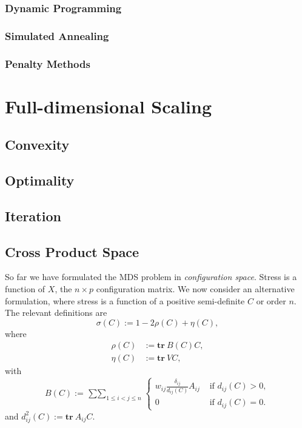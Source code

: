 \documentclass[
  12pt,
  letterpaper,
  DIV=11,
  numbers=noendperiod]{scrreprt}
\theoremstyle{remark}
\begin{document}
\subsection{Dynamic Programming}\label{unidynamic}

\subsection{Simulated Annealing}\label{uniannealing}

\subsection{Penalty Methods}\label{unipenalty}


\chapter{Full-dimensional Scaling}\label{fullchapter}

\section{Convexity}\label{fullconvex}

\section{Optimality}\label{fulloptimal}

\section{Iteration}\label{fulliteration}

\section{Cross Product Space}\label{fullcpspace}

So far we have formulated the MDS problem in \emph{configuration space}.
Stress is a function of \(X\), the \(n\times p\) configuration matrix.
We now consider an alternative formulation, where stress is a function
of a positive semi-definite \(C\) or order \(n\). The relevant
definitions are \begin{equation}
\sigma(C):=1-2\rho(C)+\eta(C),
\end{equation} where \begin{align*}
\rho(C)&:=\mathbf{tr}\ B(C)C,\\
\eta(C)&:=\mathbf{tr}\ VC,
\end{align*} with \begin{equation*}
B(C):=\mathop{\sum\sum}_{1\leq i<j\leq n} \begin{cases}w_{ij}\frac{\delta_{ij}}{d_{ij}(C)}A_{ij}&\text{ if }d_{ij}(C)>0,\\
0&\text{ if }d_{ij}(C)=0.\end{cases}
\end{equation*} and \(d_{ij}^2(C):=\mathbf{tr}\ A_{ij}C\).
\end{document}
